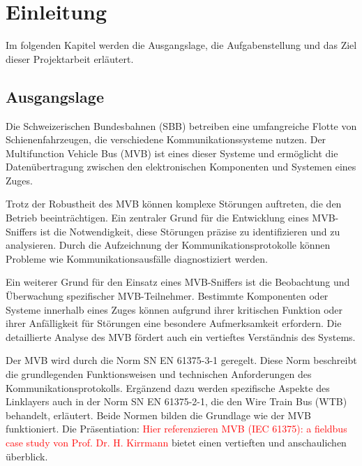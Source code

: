 

\chapter{Einleitung} %
\label{Einleitung}
Im folgenden Kapitel werden die Ausgangslage, die Aufgabenstellung und das Ziel dieser Projektarbeit erläutert. 
\section{Ausgangslage} %
\label{Ausgangslage} %


Die Schweizerischen Bundesbahnen (SBB) betreiben eine umfangreiche Flotte von Schienenfahrzeugen, die verschiedene Kommunikationssysteme nutzen. Der Multifunction Vehicle Bus (MVB) ist eines dieser Systeme und ermöglicht die Datenübertragung zwischen den elektronischen Komponenten und Systemen eines Zuges.

Trotz der Robustheit des MVB können komplexe Störungen auftreten, die den Betrieb beeinträchtigen. Ein zentraler Grund für die Entwicklung eines MVB-Sniffers ist die Notwendigkeit, diese Störungen präzise zu identifizieren und zu analysieren. Durch die Aufzeichnung der Kommunikationsprotokolle können Probleme wie Kommunikationsausfälle diagnostiziert werden.

Ein weiterer Grund für den Einsatz eines MVB-Sniffers ist die Beobachtung und Überwachung spezifischer MVB-Teilnehmer. Bestimmte Komponenten oder Systeme innerhalb eines Zuges können aufgrund ihrer kritischen Funktion oder ihrer Anfälligkeit für Störungen eine besondere Aufmerksamkeit erfordern. Die detaillierte Analyse des MVB fördert auch ein vertieftes Verständnis des Systems.

Der MVB wird durch die Norm SN EN 61375-3-1 geregelt. Diese Norm beschreibt die grundlegenden Funktionsweisen und technischen Anforderungen des Kommunikationsprotokolls. Ergänzend dazu werden spezifische Aspekte des Linklayers auch in der Norm SN EN 61375-2-1, die den Wire Train Bus (WTB) behandelt, erläutert. Beide Normen bilden die Grundlage wie der MVB funktioniert. Die Präsentiation: \textcolor{red}{Hier referenzieren MVB (IEC 61375): a fieldbus case study von Prof. Dr. H. Kirrmann} bietet einen vertieften und anschaulichen überblick.

